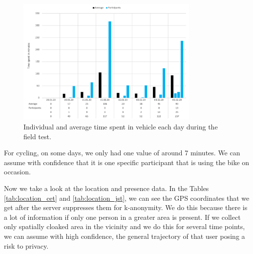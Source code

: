 \begin{figure}[htbp]
  \centering
  \includegraphics[width=0.8\textwidth]{figures/diagram_vehicle.png}
  \caption{Individual and average time spent in vehicle each day during the field test.} \label{fig:diagram_vehicle}
\end{figure}

For cycling, on some days, we only had one value of around 7 minutes. We can assume with confidence that it is one specific participant that is using the bike on occasion.

Now we take a look at the location and presence data. In the Tables \ref{tab:location_cet} and \ref{tab:location_jst}, we can see the GPS coordinates that we get after the server suppresses them for k-anonymity. We do this because there is a lot of information if only one person in a greater area is present. If we collect only spatially cloaked area in the vicinity and we do this for several time points, we can assume with high confidence, the general trajectory of that user posing a risk to privacy.

